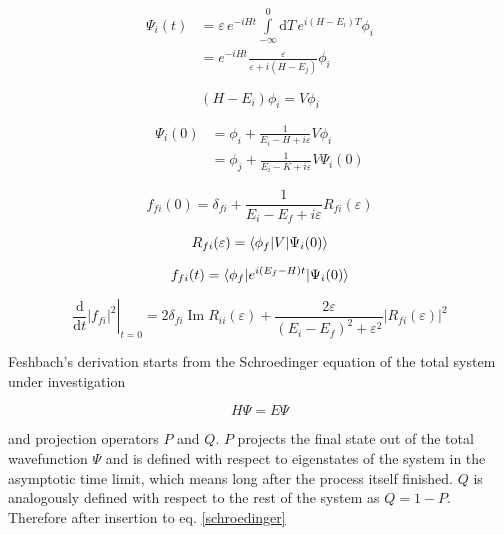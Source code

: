 \begin{align}
   \Psi_i(t) &= \varepsilon \, e^{-iHt} \int\limits_{-\infty}^0 \mathrm{d}T \,
                e^{i(H-E_i)T} \phi_i\\
             &= e^{-iHt} \frac{\varepsilon}{\varepsilon+i(H-E_j)} \phi_i
\end{align}

\begin{equation}
  (H-E_i) \phi_i = V \phi_i
\end{equation}

\begin{align}
  \Psi_i(0) &= \phi_i + \frac{1}{E_i-H+i\varepsilon} V \phi_i \\
            &= \phi_j + \frac{1}{E_i-K+i\varepsilon} V \Psi_i(0)
\end{align}

\begin{equation}
  f_{fi}(0) = \delta_{fi} + \frac{1}{E_i-E_f+i\varepsilon} R_{fi}(\varepsilon)
\end{equation}

\begin{equation}
  R_{fi}(\varepsilon) = \braket{\phi_f|V|\Psi_i(0)}
\end{equation}

\begin{equation}
  f_{fi}(t) = \braket{\phi_f| e^{i(E_f-H)t} |\Psi_i(0)}
\end{equation}

\begin{equation}
  \left . \frac{\mathrm{d}}{\mathrm{d}t} |f_{fi}|^2 \right |_{t=0}
  = 2\delta_{fi} \operatorname{Im}R_{ii}(\varepsilon) 
    + \frac{2\varepsilon}{(E_i-E_f)^2+\varepsilon^2} |R_{fi}(\varepsilon)|^2
\end{equation}


Feshbach's derivation starts from the Schroedinger equation of the total
system under investigation

\begin{equation}
  H \Psi = E \Psi \label{schroedinger}
\end{equation}

and projection operators $P$ and $Q$. $P$ projects the final state out
of the total wavefunction $\Psi$ and is defined with respect to eigenstates
of the system in the asymptotic time limit, which means long after the process
itself finished. $Q$ is analogously defined with respect to the rest of the
system as $Q = 1 - P$. Therefore after insertion to eq. \ref{schroedinger}

